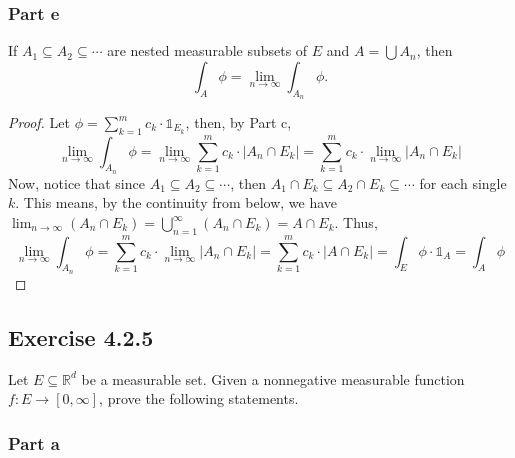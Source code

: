 \subsubsection{Part e}

\begin{question}
    If $A_1 \subseteq A_2 \subseteq \cdots$ are nested measurable subsets of $E$ and $A=\bigcup A_n$, then
    $$
    \int_A \phi=\lim _{n \rightarrow \infty} \int_{A_n} \phi.
    $$
\end{question}

\begin{answer}
    \begin{proof}
        Let $\phi = \sum_{k=1}^{m} c_k \cdot \mathbb{1}_{E_k}$, then, by Part c,
        \begin{equation}
            \lim_{n \to \infty} \int_{A_n} \phi = \lim_{n \to \infty} \sum_{k=1}^{m}c_k \cdot \lvert A_n \cap E_k \rvert = \sum_{k=1}^{m} c_k \cdot \lim_{n \to \infty} \lvert A_n \cap E_k \rvert
        \end{equation}
        Now, notice that since $A_1 \subseteq A_2 \subseteq \cdots$, then $A_1 \cap E_k \subseteq A_2 \cap E_k \subseteq \cdots$ for each single $k$. This means, by the continuity from below, we have $\lim_{n \to \infty}  (A_n \cap E_k) = \bigcup_{n = 1}^{\infty}(A_n \cap E_k) = A\cap E_k$. Thus,
        \begin{equation}
            \lim_{n \to \infty} \int_{A_n} \phi = \sum_{k=1}^{m} c_k \cdot \lim_{n \to \infty} \lvert A_n \cap E_k \rvert = \sum_{k=1}^{m} c_k \cdot \lvert A \cap E_k \rvert = \int_E \phi\cdot\mathbb{1}_{A} = \int_A \phi
        \end{equation}
    \end{proof}
\end{answer}

\subsection{Exercise 4.2.5}

\begin{question}
    Let $E \subseteq \mathbb{R}^d$ be a measurable set. Given a nonnegative measurable function $f: E \rightarrow[0, \infty]$, prove the following statements.
\end{question}

\subsubsection{Part a}

